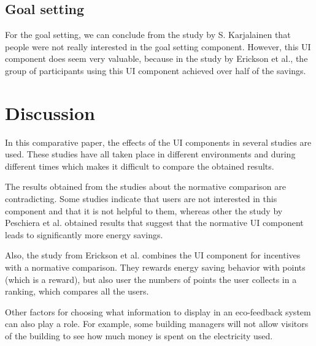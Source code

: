 \documentclass[journal]{vgtc}                %
\begin{document}

\subsection{Goal setting}
For the goal setting, we can conclude from the study by S. Karjalainen that people were not really interested in the goal setting component. However, this UI component does seem very valuable, because in the study by Erickson et al., the group of participants using this UI component achieved over half of the savings.


\section{Discussion}
In this comparative paper, the effects of the UI components in several studies are used. These studies have all taken place in different environments and during different times which makes it difficult to compare the obtained results.

The results obtained from the studies about the normative comparison are contradicting. Some studies indicate that users are not interested in this component and that it is not helpful to them, whereas other the study by Peschiera et al. obtained results that suggest that the normative UI component leads to significantly more energy savings.

Also, the study from Erickson et al. combines the UI component for incentives with a normative comparison. They rewards energy saving behavior with points (which is a reward), but also user the numbers of points the user collects in a ranking, which compares all the users.

Other factors for choosing what information to display in an eco-feedback system can also play a role. For example, some building managers will not allow visitors of the building to see how much money is spent on the electricity used.
\end{document}

